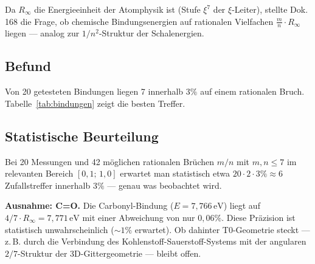Da $R_\infty$ die Energieeinheit der Atomphysik ist (Stufe $\xi^7$ der
$\xi$-Leiter), stellte Dok.\,168 die Frage, ob chemische Bindungsenergien
auf rationalen Vielfachen $\frac{m}{n} \cdot R_\infty$ liegen — analog zur
$1/n^2$-Struktur der Schalenergien.

\subsection{Befund}
\label{subsec:befund-be}

Von 20 getesteten Bindungen liegen 7 innerhalb $3\%$ auf einem rationalen Bruch.
Tabelle~\ref{tab:bindungen} zeigt die besten Treffer.

\begin{table}[htbp]
\centering
\caption{Bindungsenergien auf rationalen Vielfachen von $R_\infty$ (NIST-Werte)}
\label{tab:bindungen}
\end{table}

\subsection{Statistische Beurteilung}
\label{subsec:statistik-be}

Bei 20 Messungen und 42 möglichen rationalen Brüchen $m/n$ mit $m,n \leq 7$
im relevanten Bereich $[0{,}1;\, 1{,}0]$ erwartet man statistisch etwa
$20 \cdot 2 \cdot 3\% \approx 6$ Zufallstreffer innerhalb $3\%$
— genau was beobachtet wird.

\textbf{Ausnahme: C=O.}
Die Carbonyl-Bindung ($E = 7{,}766\,\mathrm{eV}$) liegt auf
$4/7 \cdot R_\infty = 7{,}771\,\mathrm{eV}$ mit einer Abweichung von
nur $0{,}06\%$. Diese Präzision ist statistisch unwahrscheinlich ($\sim1\%$
erwartet). Ob dahinter T0-Geometrie steckt — z.\,B. durch die Verbindung
des Kohlenstoff-Sauerstoff-Systems mit der angularen $2/7$-Struktur
der 3D-Gittergeometrie — bleibt offen.

